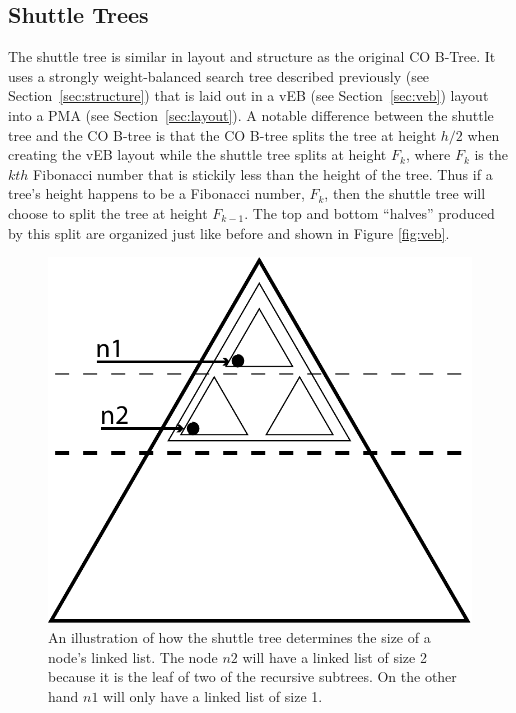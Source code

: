 \documentclass{style}
\begin{document}
\subsection{Shuttle Trees}

The shuttle tree is similar in layout and structure as the original CO B-Tree.
It uses a strongly weight-balanced search tree described previously (see
Section~\ref{sec:structure}) that is laid out in a vEB (see
Section~\ref{sec:veb}) layout into a PMA (see Section~\ref{sec:layout}). A
notable difference between the shuttle tree and the CO B-tree is that the CO
B-tree splits the tree at height $h/2$ when creating the vEB layout while the
shuttle tree splits at height $F_k$, where $F_k$ is the $kth$ Fibonacci number
that is stickily less than the height of the tree. Thus if a tree's height
happens to be a Fibonacci number, $F_k$, then the shuttle tree will choose to
split the tree at height $F_{k-1}$. The top and bottom ``halves'' produced by
this split are organized just like before and shown in Figure \ref{fig:veb}.

\begin{figure}

\begin{center}
	\includegraphics[width=0.8\columnwidth]{figures/buffers.pdf}
\end{center}

\caption{An illustration of how the shuttle tree determines the size of a node's linked list. The 
node $n2$ will have a linked list of size 2 because it is the leaf of two of the recursive subtrees. 
On the other hand $n1$ will only have a linked list of size 1.}
\label{fig:buffers}
\end{figure}
\end{document}
